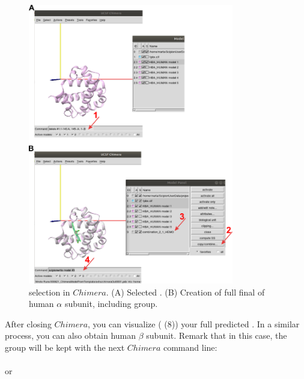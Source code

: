  \\
 
 \begin{figure}[H]
  \centering 
  \captionsetup{width=.7\linewidth} 
  \includegraphics[width=0.80\textwidth]{Images/Fig16.png}
  \caption{ selection in $Chimera$. (A) Selected  . (B) Creation of full final  of human  $\alpha$ subunit, including  group.}
  \label{fig:chimera_model}
  \end{figure}
 
 After closing $Chimera$, you can visualize ( (8)) your full predicted . In a similar process, you can also obtain human  $\beta$ subunit. Remark that in this case, the  group will be kept with the next $Chimera$ command line: \\
 \\ or \\
 \\ \\ \\
  
